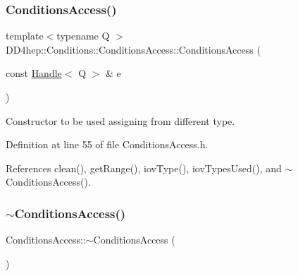 \hypertarget{class_d_d4hep_1_1_conditions_1_1_conditions_access_a0807e34c93de398b31526a30f1028e44}{}\label{class_d_d4hep_1_1_conditions_1_1_conditions_access_a0807e34c93de398b31526a30f1028e44} 
\subsubsection{\texorpdfstring{Conditions\+Access()}{ConditionsAccess()}\hspace{0.1cm}{\footnotesize\ttfamily [4/4]}}
{\footnotesize\ttfamily template$<$typename Q $>$ \\
D\+D4hep\+::\+Conditions\+::\+Conditions\+Access\+::\+Conditions\+Access (\begin{DoxyParamCaption}\item[{const \hyperlink{class_d_d4hep_1_1_handle}{Handle}$<$ Q $>$ \&}]{e }\end{DoxyParamCaption})\hspace{0.3cm}{\ttfamily [inline]}}



Constructor to be used assigning from different type. 



Definition at line 55 of file Conditions\+Access.\+h.



References clean(), get\+Range(), iov\+Type(), iov\+Types\+Used(), and $\sim$\+Conditions\+Access().

\hypertarget{class_d_d4hep_1_1_conditions_1_1_conditions_access_ab654b88bad13706fd78d4a92c1ba0eb4}{}\label{class_d_d4hep_1_1_conditions_1_1_conditions_access_ab654b88bad13706fd78d4a92c1ba0eb4} 
\subsubsection{\texorpdfstring{$\sim$\+Conditions\+Access()}{~ConditionsAccess()}}
{\footnotesize\ttfamily Conditions\+Access\+::$\sim$\+Conditions\+Access (\begin{DoxyParamCaption}{ }\end{DoxyParamCaption})}



